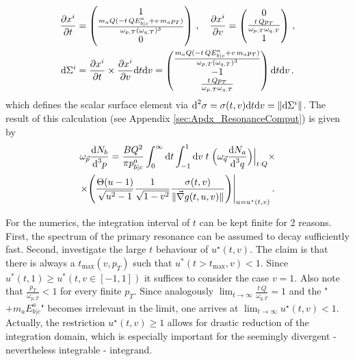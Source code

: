 \begin{gather}
    \frac{\partial x^i}{\partial t}
        =\begin{pmatrix}
            1\\
            \frac{m_aQ(-t\,QE^a_{b\vert c}+v\,m_a p_T)}{\omega_{p,T}(\omega_{q,T})^3}\\
            0
        \end{pmatrix}\,,\quad
    \frac{\partial x^i}{\partial v}=\begin{pmatrix}
        0\\
        \frac{t\,Qp_T}{\omega_{p,T}\omega_{q,T}}\\
        1
    \end{pmatrix}\,,\\
    \text{d}\Sigma^i=\frac{\partial x^i}{\partial t}\times \frac{\partial x^i}{\partial v}\text{d} t\text{d} v=\begin{pmatrix}
        \frac{m_aQ(-t\,QE^a_{b\vert c}+v\,m_a p_T)}{\omega_{p,T}(\omega_{q,T})^3}\\
        -1\\
        \frac{t\,Qp_T}{\omega_{p,T}\omega_{q,T}}
    \end{pmatrix}\text{d} t\text{d} v\,.
\end{gather}
which defines the scalar surface element via $\text{d}^2\sigma=\sigma(t,v)\text{d} t\text{d} v=\Vert\text{d}\Sigma^i\Vert$. The result of this calculation (see Appendix \ref{sec:Apdx_ResonanceComput}) is given by
\begin{multline}
    \omega_{\vec{p}}\frac{\text{d} N_b}{\text{d}^3p}=\frac{BQ^2}{\pi p^a_{b\vert c}}\int_0^\infty\text{d} t\int_{-1}^1\text{d} v\;t\;\Big(\omega_{\vec{q}}\frac{\text{d} N_a}{\text{d}^3 q}\Big)\Big\vert_{t\cdot Q }\times\\
    \times\Bigg(\frac{\Theta(u-1)}{\sqrt{u^2-1}}\frac{1}{\sqrt{1-v^2}}\frac{\sigma(t,v)}{\Vert\vec{\nabla}g(t,u,v)\Vert}\Bigg)\Bigg\vert_{u=u^\star(t,v)}\,.
    \label{eq:DecayCalc_FinalIntegral}
\end{multline}

For the numerics, the integration interval of $t$ can be kept finite for 2 reasons. First, the spectrum of the primary resonance can be assumed to decay sufficiently fast. Second, investigate the large $t$ behaviour of $u^\star(t,v)$. The claim is that there is always a $t_{\text{max}}(v,p_T)$ such that ${u^*(t>t_{\text{max}},v)<1}$. Since ${u^*(t,1)\geq u^*(t,v\in[-1,1])}$ it suffices to consider the case $v=1$. Also note that ${\frac{p_T}{\omega_{p,T}}<1}$ for every finite $p_T$. Since analogously ${\lim_{t\to\infty}\frac{t\,Q}{\omega_{q,T}}=1}$ and the "${+m_a E^a_{b\vert c}}$" becomes irrelevant in the limit, one arrives at ${\lim_{t\to\infty}u^\star(t,v)<1}$. Actually, the restriction ${u^\star(t,v)\geq 1}$ allows for drastic reduction of the integration domain, which is especially important for the seemingly divergent - nevertheless integrable - integrand.

